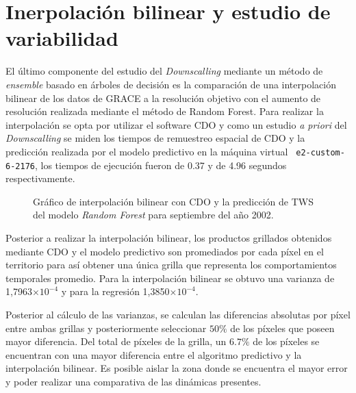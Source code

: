%
%
%
%

\section{Inerpolación bilinear y estudio de variabilidad}
El último componente del estudio del \textit{Downscalling} mediante un método de \textit{ensemble} basado en árboles de decisión es la comparación de una interpolación bilinear de los datos de GRACE a la resolución objetivo
con el aumento de resolución realizada mediante el método de Random Forest. Para realizar la interpolación se opta por utilizar el software CDO y como un estudio \textit{a priori} del \textit{Downscalling} se miden los tiempos de remuestreo
espacial de CDO y la predicción realizada por el modelo predictivo en la máquina virtual \texttt{ e2-custom-6-2176}, los tiempos de ejecución fueron de 0.37 y de 4.96 segundos respectivamente.

\begin{figure}[H]
    \centering
          \goodgap
          \vskip -0.1in
    \caption[Comparación de interpolación bilinear y \textit{Random Forest}]{Gráfico de interpolación bilinear con CDO y la predicción de TWS del modelo \textit{Random Forest} para septiembre del año 2002.}
    \label{interp02}
\end{figure}

Posterior a realizar la interpolación bilinear, los productos grillados obtenidos mediante CDO y el modelo predictivo son promediados por cada píxel en el territorio para así obtener una única grilla que representa los comportamientos temporales promedio. Para la interpolación bilinear se 
obtuvo una varianza de 1,7963$\times 10^{-4}$ y para la regresión 1,3850$\times 10^{-4}$. 

Posterior al cálculo de las varianzas,
se calculan las diferencias absolutas por píxel entre ambas grillas y posteriormente seleccionar $50\%$ de los píxeles que poseen mayor diferencia. Del total de píxeles de la grilla, un $6.7\%$ de los píxeles se encuentran con una mayor diferencia entre el algoritmo predictivo y la interpolación bilinear.
Es posible aislar la zona donde se encuentra el mayor error y poder realizar una comparativa de las dinámicas presentes.

